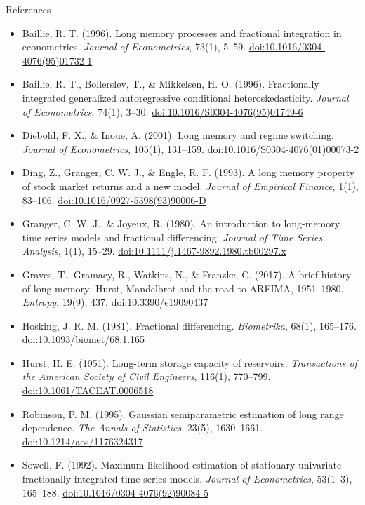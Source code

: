 \begin{frame}{References}
\itemsize{\tiny}
\begin{itemize}
    \item Baillie, R. T. (1996). Long memory processes and fractional integration in econometrics. \textit{Journal of Econometrics}, 73(1), 5--59. \href{https://doi.org/10.1016/0304-4076(95)01732-1}{doi:10.1016/0304-4076(95)01732-1}
    \item Baillie, R. T., Bollerslev, T., \& Mikkelsen, H. O. (1996). Fractionally integrated generalized autoregressive conditional heteroskedasticity. \textit{Journal of Econometrics}, 74(1), 3--30. \href{https://doi.org/10.1016/S0304-4076(95)01749-6}{doi:10.1016/S0304-4076(95)01749-6}
    \item Diebold, F. X., \& Inoue, A. (2001). Long memory and regime switching. \textit{Journal of Econometrics}, 105(1), 131--159. \href{https://doi.org/10.1016/S0304-4076(01)00073-2}{doi:10.1016/S0304-4076(01)00073-2}
    \item Ding, Z., Granger, C. W. J., \& Engle, R. F. (1993). A long memory property of stock market returns and a new model. \textit{Journal of Empirical Finance}, 1(1), 83--106. \href{https://doi.org/10.1016/0927-5398(93)90006-D}{doi:10.1016/0927-5398(93)90006-D}
    \item Granger, C. W. J., \& Joyeux, R. (1980). An introduction to long-memory time series models and fractional differencing. \textit{Journal of Time Series Analysis}, 1(1), 15--29. \href{https://doi.org/10.1111/j.1467-9892.1980.tb00297.x}{doi:10.1111/j.1467-9892.1980.tb00297.x}
    \item Graves, T., Gramacy, R., Watkins, N., \& Franzke, C. (2017). A brief history of long memory: Hurst, Mandelbrot and the road to ARFIMA, 1951--1980. \textit{Entropy}, 19(9), 437. \href{https://doi.org/10.3390/e19090437}{doi:10.3390/e19090437}
    \item Hosking, J. R. M. (1981). Fractional differencing. \textit{Biometrika}, 68(1), 165--176. \href{https://doi.org/10.1093/biomet/68.1.165}{doi:10.1093/biomet/68.1.165}
    \item Hurst, H. E. (1951). Long-term storage capacity of reservoirs. \textit{Transactions of the American Society of Civil Engineers}, 116(1), 770--799. \href{https://doi.org/10.1061/TACEAT.0006518}{doi:10.1061/TACEAT.0006518}
    \item Robinson, P. M. (1995). Gaussian semiparametric estimation of long range dependence. \textit{The Annals of Statistics}, 23(5), 1630--1661. \href{https://doi.org/10.1214/aos/1176324317}{doi:10.1214/aos/1176324317}
    \item Sowell, F. (1992). Maximum likelihood estimation of stationary univariate fractionally integrated time series models. \textit{Journal of Econometrics}, 53(1--3), 165--188. \href{https://doi.org/10.1016/0304-4076(92)90084-5}{doi:10.1016/0304-4076(92)90084-5}
\end{itemize}
\end{frame}


